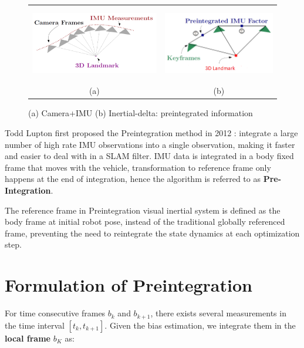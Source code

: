 \documentclass[12pt]{report}   %
\begin{document}
\begin{figure}[!h]
	\begin{center}\begin{tabular}{cc}
		\includegraphics[height=3.3cm]{figures/IMU-sample_Image-frames_3D_illustration.png}&
		\includegraphics[height=3.3cm]{figures/Preintegrated-IMU_image_3D_illustration.png}\\
		(a) & (b) \\
	\end{tabular}\end{center}
	\caption{(a) Camera+IMU (b) Inertial-delta: preintegrated information \cite{Manifold2015}} 
	\label{fig:VIN sensor information}
\end{figure} 

Todd Lupton first proposed the Preintegration method in 2012 \cite{Lupton2012}:
integrate a large number of high rate IMU observations into a single
observation, making it faster and easier to deal with in a SLAM filter. IMU data
is integrated in a body fixed frame that moves with the vehicle, transformation
to reference frame only happens at the end of integration, hence the algorithm
is referred to as \textbf{Pre-Integration}.

The reference frame in Preintegration visual inertial system is defined as the
body frame at initial robot pose, instead of the traditional globally referenced
frame, preventing the need to reintegrate the state dynamics at each
optimization step.

\section{Formulation of Preintegration}\label{sec:preintegration}
For time consecutive frames $b_k$ and $b_{k+1}$, there exists several
measurements in the time interval $[t_k, t_{k+1}]$. Given the bias estimation,
we integrate them in the \textbf{local frame} $b_K$ as:
\end{document}

